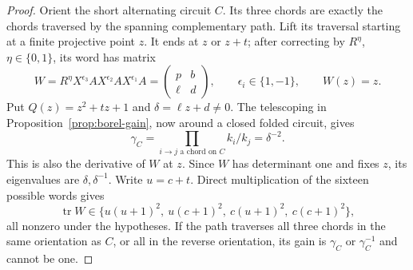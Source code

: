 \documentclass[11pt,a4paper]{article}
\theoremstyle{definition}
\theoremstyle{remark}
\begin{document}
\begin{proof}
Orient the short alternating circuit $C$.  Its three chords are exactly the chords traversed by the spanning complementary path.  Lift its traversal starting at a finite projective point $z$.  It ends at $z$ or $z+t$; after correcting by $R^\eta$, $\eta\in\{0,1\}$, its word has matrix
\[
 W=R^\eta X^{\epsilon_3}A X^{\epsilon_2}A X^{\epsilon_1}A
   =\begin{pmatrix}p&b\\\ell&d\end{pmatrix},\qquad
 \epsilon_i\in\{1,-1\},\qquad W(z)=z.
\]
Put $Q(z)=z^2+tz+1$ and $\delta=\ell z+d\ne0$.  The telescoping in Proposition~\ref{prop:borel-gain}, now around a closed folded circuit, gives
\[
 \gamma_C=\prod_{i\to j\text{ a chord on }C}k_i/k_j=\delta^{-2}.
\]
This is also the derivative of $W$ at $z$.  Since $W$ has determinant one and fixes $z$, its eigenvalues are $\delta,\delta^{-1}$.  Write $u=c+t$.  Direct multiplication of the sixteen possible words gives
\[
 \operatorname{tr}W\in
 \{u(u+1)^2,\ u(c+1)^2,\ c(u+1)^2,\ c(c+1)^2\},
\]
all nonzero under the hypotheses.  If the path traverses all three chords in the same orientation as $C$, or all in the reverse orientation, its gain is $\gamma_C$ or $\gamma_C^{-1}$ and cannot be one.


\end{proof}
\end{document}
